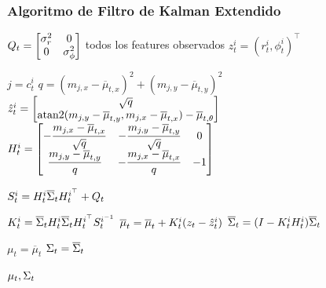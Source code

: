 \begin{frame}
    \frametitle{Algoritmo de Filtro de Kalman Extendido}
    \footnotesize
     \begin{algorithmic}[1]
        \State
        $ Q_{t} =
            \begin{bmatrix}
                \sigma_{r}^{2} & 0\\
                0 & \sigma_{\phi}^{2}
            \end{bmatrix}
        $
        \For todos los features observados $z_{t}^{i} = (r_{t}^{i}, \phi_{t}^{i})^{\top}$
        
        \State $ j = c_{t}^{i}$
        \State $ q = (m_{j,x}-\overline{\mu}_{t,x})^{2} + (m_{j,y}-\overline{\mu}_{t,y})^{2} $
        \State
        $ \hat{z}_{t}^{i} =
            \begin{bmatrix}
                \sqrt{q}\\
                \operatorname{atan2}(m_{j,y}-\overline{\mu}_{t,y}, m_{j,x}-\overline{\mu}_{t,x}) - \overline{\mu}_{t,\theta}
            \end{bmatrix}
        $
        \State
        $ H_{t}^{i} = 
            \begin{bmatrix}
                -\dfrac{m_{j,x} - \overline{\mu}_{t,x}}{\sqrt{q}} & -\dfrac{m_{j,y} - \overline{\mu}_{t,y}}{\sqrt{q}}  & 0\\
                \dfrac{m_{j,y} - \overline{\mu}_{t,y}}{q}  & -\dfrac{m_{j,x} - \overline{\mu}_{t,x}}{q}  & -1
            \end{bmatrix}
        $
        
        \State $S_{t}^{i} = H_{t}^{i} \overline{\Sigma}_{t} H_{t}^{i^{\top}} + Q_{t} $

        \State $K_{t}^{i} = \overline{\Sigma}_{t} {H_{t}^{i}} \overline{\Sigma}_{t} H_{t}^{i^{\top}} S_{t}^{i^{-1}} $
        \State $\overline{\mu}_{t} = \overline{\mu}_{t} + K_{t}^{i}(z_{t} - \hat{z}_{t}^{i})$
        \State $\overline{\Sigma}_{t} = (I - K_{t}^{i}H_{t}^{i})\overline{\Sigma}_{t}$
        
        \EndFor
        \State $\mu_{t} = \overline{\mu}_{t}$
        \State $\Sigma_{t} = \overline{\Sigma}_{t}$
        
        \State \Return $\mu_{t}, \Sigma_{t}$
    \end{algorithmic}
    
    
\end{frame}

